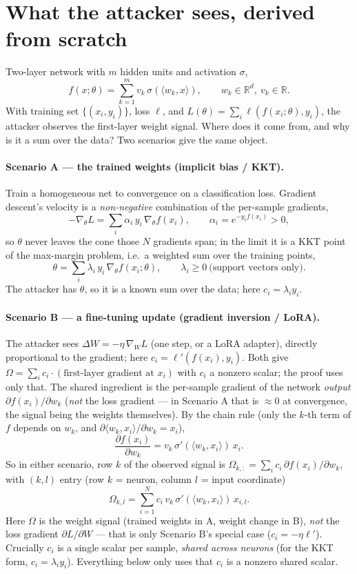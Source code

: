 \documentclass[11pt]{article}
\theoremstyle{definition}
\newcommand{\R}{\mathbb{R}}
\newcommand{\ip}[2]{\langle #1, #2\rangle}
\newcommand{\Om}{\Omega}
\begin{document}
\section{What the attacker sees, derived from scratch}
Two-layer network with $m$ hidden units and activation $\sigma$,
\[
f(x;\theta)=\sum_{k=1}^{m} v_k\,\sigma(\ip{w_k}{x}),\qquad w_k\in\R^d,\ v_k\in\R .
\]
With training set $\{(x_i,y_i)\}$, loss $\ell$, and $L(\theta)=\sum_i \ell(f(x_i;\theta),y_i)$,
the attacker observes the first-layer weight signal. Where does it come from, and why is it a sum
over the data? Two scenarios give the same object.

\paragraph{Scenario A --- the trained weights (implicit bias / KKT).} Train a homogeneous net to
convergence on a classification loss. Gradient descent's velocity is a \emph{non-negative}
combination of the per-sample gradients,
\[
-\nabla_\theta L=\sum_i \alpha_i\,y_i\,\nabla_\theta f(x_i),\qquad \alpha_i=e^{-y_i f(x_i)}>0,
\]
so $\theta$ never leaves the cone those $N$ gradients span; in the limit it is a KKT point of the
max-margin problem, i.e.\ a weighted sum over the training points,
\[
\theta=\sum_i \lambda_i\,y_i\,\nabla_\theta f(x_i;\theta),\qquad \lambda_i\ge0\ \text{(support
vectors only)}.
\]
The attacker has $\theta$, so it is a known sum over the data; here $c_i=\lambda_i y_i$.

\paragraph{Scenario B --- a fine-tuning update (gradient inversion / LoRA).} The attacker sees
$\Delta W=-\eta\,\nabla_W L$ (one step, or a LoRA adapter), directly proportional to the gradient;
here $c_i=\ell'(f(x_i),y_i)$. Both give $\Om=\sum_i c_i\cdot(\text{first-layer gradient at }x_i)$
with $c_i$ a nonzero scalar; the proof uses only that. The shared ingredient is the per-sample
gradient of the network \emph{output} $\partial f(x_i)/\partial w_k$ (\emph{not} the loss gradient
--- in Scenario A that is $\approx0$ at convergence, the signal being the weights themselves). By
the chain rule (only the $k$-th term of $f$ depends on $w_k$, and
$\partial\ip{w_k}{x_i}/\partial w_k=x_i$),
\[
\frac{\partial f(x_i)}{\partial w_k}=v_k\,\sigma'(\ip{w_k}{x_i})\,x_i .
\]
So in either scenario, row $k$ of the observed signal is
$\Om_{k,:}=\sum_i c_i\,\partial f(x_i)/\partial w_k$, with $(k,l)$ entry (row $k$ = neuron,
column $l$ = input coordinate)
\begin{equation}\label{eq:obs}
\Om_{k,l}=\sum_{i=1}^{N} c_i\, v_k\,\sigma'(\ip{w_k}{x_i})\,x_{i,l}.
\end{equation}
Here $\Om$ is the weight signal (trained weights in A, weight change in B), \emph{not} the loss
gradient $\partial L/\partial W$ --- that is only Scenario B's special case ($c_i=-\eta\ell'$).
Crucially $c_i$ is a single scalar per sample, \emph{shared across neurons} (for the KKT form,
$c_i=\lambda_i y_i$). Everything below only uses that $c_i$ is a nonzero shared scalar.
\end{document}
